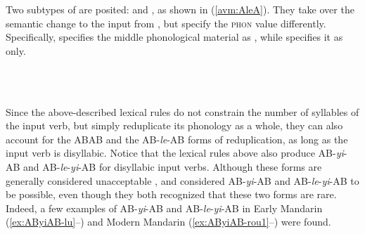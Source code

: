 Two subtypes of  are posited:
and , as shown in (\ref{avm:AleA}). %
They take over the semantic change to the input from , but specify the \textsc{phon} value differently.
Specifically,  specifies the middle phonological material as
, while  specifies it as  only.


\ea\label{avm:AleA}
\ea    %
         \impl\\
\ex   %
     \impl\\
\z
\z



Since the above-described lexical rules do not constrain the number of syllables of the input verb, but simply reduplicate its phonology  as a whole,
they can also account for the ABAB and the AB-\textit{le}-AB forms of reduplication,
as long as the input verb is disyllabic.
Notice that  the lexical rules above also produce AB-\textit{yi}-AB and AB\hyp{}\textit{le}\hyp{}\textit{yi}\hyp{}AB for disyllabic input verbs.
Although these forms are generally considered unacceptable \citetext{\citealp[30]{LiThompson1981}; \citealp[275--276]{Hong1999};  \citealp[160]{BascianoMelloni2017}; \citealp[239]{YangWei2017}}, 
\citet[269]{Fan1964} and \citet[143]{Sui2018} considered AB-\textit{yi}-AB and AB-\textit{le}-\textit{yi}-AB to be possible, even though they both recognized that these two forms are rare.
Indeed, a few examples of AB\hyp{}\emph{yi}\hyp{}AB and AB\hyp{}\emph{le}\hyp{}\emph{yi}\hyp{}AB in Early Mandarin %
 (\ref{ex:AByiAB-lu}--) and Modern Mandarin (\ref{ex:AByiAB-rou1}--) were found.

